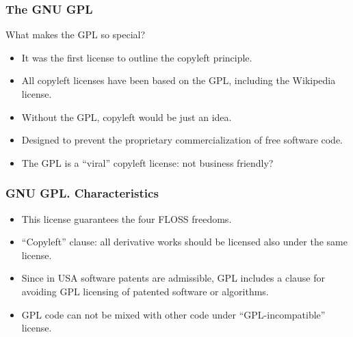 \documentclass{beamer}
\begin{document}
\begin{frame}
\frametitle{The GNU GPL}

What makes the GPL so special?
\pause
\begin{itemize}
\item It was the first license to outline the copyleft principle.
\item All copyleft licenses have been based on the GPL, including the Wikipedia license.
\item Without the GPL, copyleft would be just an idea. 
\item Designed to prevent the proprietary commercialization of free software code.
\item The GPL is a ``viral'' copyleft license: not business friendly?
\end{itemize}

\end{frame}


\begin{frame}
\frametitle{GNU GPL. Characteristics}

\begin{itemize}
\item This license guarantees the four FLOSS freedoms.
\item ``\alert{Copyleft}'' clause: all derivative works should be
  licensed also under the same license.
\item Since in USA software patents are admissible, GPL includes a
  clause for avoiding GPL licensing of patented software or
  algorithms.
\item GPL code can not be mixed with other code under
  ``GPL-incompatible'' license.
\end{itemize}

\end{frame}

\end{document}
